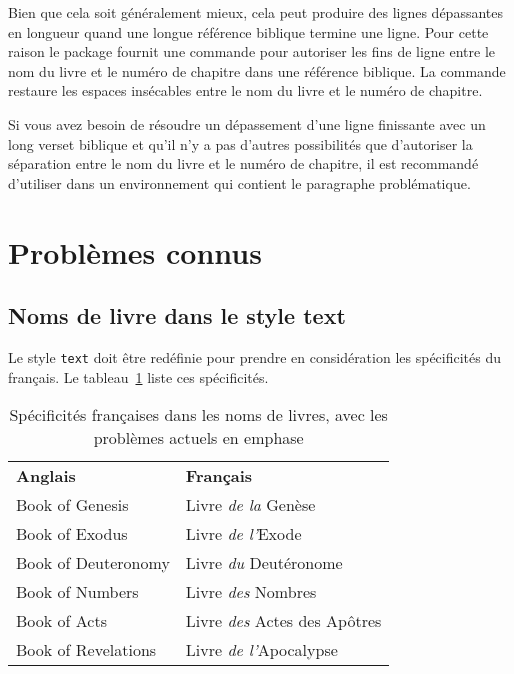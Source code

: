 \documentclass{ltxdoc}
\begin{document}
Bien que cela soit généralement mieux, cela peut produire des lignes dépassantes en longueur quand une longue référence biblique termine une ligne.
Pour cette raison le package fournit une commande  pour autoriser les fins de ligne entre le nom du livre et le numéro de chapitre dans une référence biblique.
La commande  restaure les espaces insécables entre le nom du livre et le numéro de chapitre.

Si vous avez besoin de résoudre un dépassement d'une ligne finissante avec un long verset biblique et qu'il n'y a pas d'autres possibilités que d'autoriser la séparation entre le nom du livre et le numéro de chapitre, il est recommandé d'utiliser  dans un environnement qui contient le paragraphe problématique.

\section{Problèmes connus}

\subsection{Noms de livre dans le style  \textsf{text}}

Le style \verb|text| doit être redéfinie pour prendre en considération les spécificités du français. Le tableau~\ref{tab:textspec} liste ces spécificités.

\begin{table}[tbh]
\caption{Spécificités françaises dans les noms de livres, avec les problèmes actuels en emphase} 
\label{tab:textspec}
\vspace{10pt}
\begin{center}
\begin{tabular}{lp{}}
\bfseries Anglais & \bfseries Français\\
Book of Genesis & Livre \emph{de la} Gen\`ese\\
Book of Exodus & Livre \emph{de l'}Exode\\
Book of Deuteronomy & Livre \emph{du} Deut\'eronome\\
Book of Numbers & Livre \emph{des} Nombres\\
Book of Acts & Livre \emph{des} Actes des Ap\^otres\\
Book of Revelations & Livre \emph{de l'}Apocalypse\\
\end{tabular}
\end{center}
\end{table}
\end{document}
